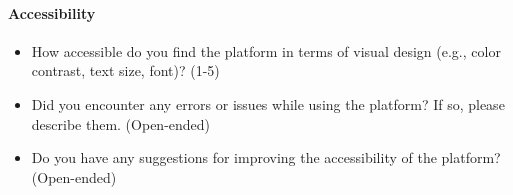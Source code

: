 \documentclass[12pt, titlepage]{article}
\begin{document}
\paragraph{Accessibility}
\begin{itemize}
    \item{How accessible do you find the platform in terms of visual design (e.g., color contrast, text size, font)? (1-5)}
    \item{Did you encounter any errors or issues while using the platform? If so, please describe them. (Open-ended)}
    \item{Do you have any suggestions for improving the accessibility of the platform?
          (Open-ended)}
\end{itemize}

\newpage{}
\end{document}
